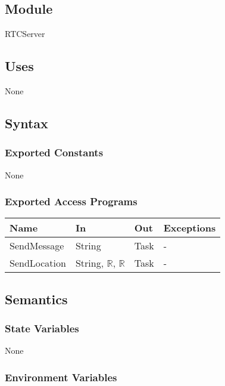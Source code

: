 \documentclass[12pt, titlepage]{article}
\begin{document}
\subsection{Module}

RTCServer

\subsection{Uses}

None

\subsection{Syntax}

\subsubsection{Exported Constants}

None

\subsubsection{Exported Access Programs}

\begin{center}
\begin{tabular}{p{4cm} p{3cm} p{2cm} p{3cm}}
\hline
\textbf{Name} & \textbf{In} & \textbf{Out} & \textbf{Exceptions} \\
\hline
SendMessage & String & Task & - \\
SendLocation & String, $\mathbb{R}$, $\mathbb{R}$ & Task & - \\

\hline
\end{tabular}
\end{center}

\subsection{Semantics}

\subsubsection{State Variables}

None

\subsubsection{Environment Variables}
\end{document}
